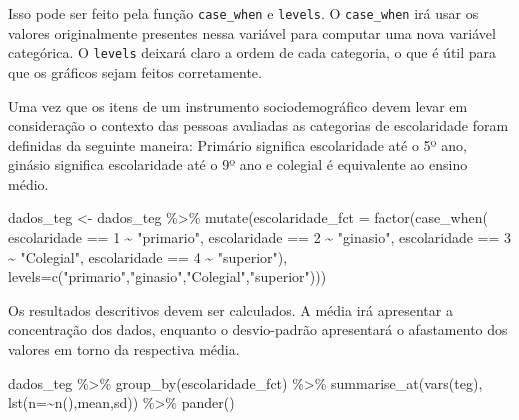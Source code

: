 \documentclass[
]{book}
\newenvironment{Shaded}{\begin{snugshade}}{\end{snugshade}}
\newcommand{\AttributeTok}[1]{\textcolor[rgb]{0.77,0.63,0.00}{#1}}
\newcommand{\DecValTok}[1]{\textcolor[rgb]{0.00,0.00,0.81}{#1}}
\newcommand{\FunctionTok}[1]{\textcolor[rgb]{0.00,0.00,0.00}{#1}}
\newcommand{\NormalTok}[1]{#1}
\newcommand{\OtherTok}[1]{\textcolor[rgb]{0.56,0.35,0.01}{#1}}
\newcommand{\SpecialCharTok}[1]{\textcolor[rgb]{0.00,0.00,0.00}{#1}}
\newcommand{\StringTok}[1]{\textcolor[rgb]{0.31,0.60,0.02}{#1}}
\begin{document}
Isso pode ser feito pela função \texttt{case\_when} e \texttt{levels}. O \texttt{case\_when} irá usar os valores originalmente presentes nessa variável para computar uma nova variável categórica. O \texttt{levels} deixará claro a ordem de cada categoria, o que é útil para que os gráficos sejam feitos corretamente.

Uma vez que os itens de um instrumento sociodemográfico devem levar em consideração o contexto das pessoas avaliadas as categorias de escolaridade foram definidas da seguinte maneira: Primário significa escolaridade até o 5º ano, ginásio significa escolaridade até o 9º ano e colegial é equivalente ao ensino médio.

\begin{Shaded}
\begin{Highlighting}[]
\NormalTok{dados\_teg }\OtherTok{\textless{}{-}}\NormalTok{ dados\_teg }\SpecialCharTok{\%\textgreater{}\%} 
  \FunctionTok{mutate}\NormalTok{(}\AttributeTok{escolaridade\_fct =} \FunctionTok{factor}\NormalTok{(}\FunctionTok{case\_when}\NormalTok{(}
\NormalTok{      escolaridade }\SpecialCharTok{==} \DecValTok{1} \SpecialCharTok{\textasciitilde{}} \StringTok{"primario"}\NormalTok{,}
\NormalTok{      escolaridade }\SpecialCharTok{==} \DecValTok{2} \SpecialCharTok{\textasciitilde{}} \StringTok{"ginasio"}\NormalTok{,}
\NormalTok{      escolaridade }\SpecialCharTok{==} \DecValTok{3} \SpecialCharTok{\textasciitilde{}} \StringTok{"Colegial"}\NormalTok{,}
\NormalTok{      escolaridade }\SpecialCharTok{==} \DecValTok{4} \SpecialCharTok{\textasciitilde{}} \StringTok{"superior"}\NormalTok{), }
      \AttributeTok{levels=}\FunctionTok{c}\NormalTok{(}\StringTok{"primario"}\NormalTok{,}\StringTok{"ginasio"}\NormalTok{,}\StringTok{"Colegial"}\NormalTok{,}\StringTok{"superior"}\NormalTok{)))}
\end{Highlighting}
\end{Shaded}

Os resultados descritivos devem ser calculados. A média irá apresentar a concentração dos dados, enquanto o desvio-padrão apresentará o afastamento dos valores em torno da respectiva média.

\begin{Shaded}
\begin{Highlighting}[]
\NormalTok{dados\_teg }\SpecialCharTok{\%\textgreater{}\%} 
  \FunctionTok{group\_by}\NormalTok{(escolaridade\_fct) }\SpecialCharTok{\%\textgreater{}\%} 
  \FunctionTok{summarise\_at}\NormalTok{(}\FunctionTok{vars}\NormalTok{(teg), }\FunctionTok{lst}\NormalTok{(}\AttributeTok{n=}\SpecialCharTok{\textasciitilde{}}\FunctionTok{n}\NormalTok{(),mean,sd)) }\SpecialCharTok{\%\textgreater{}\%} 
  \FunctionTok{pander}\NormalTok{() }
\end{Highlighting}
\end{Shaded}
\end{document}
